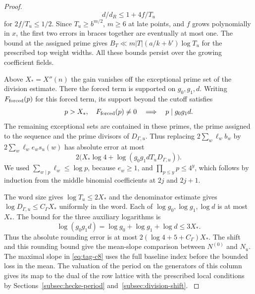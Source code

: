 \begin{proof}
\[
  d/d_R\le 1+4f/T_u
\]
 for \(2f/T_u\le1/2\). Since \(T_u\ge b^{m/2}\),
\(m\ge6\) at late points, and \(f\) grows polynomially in \(x\), the
first two errors in braces together are eventually at most one.
The bound at the assigned prime gives
\(B_T\ll m |T|(a/k+b')\log T_u\) for the prescribed top weight
widths. All these bounds persist over the growing coefficient fields.


Above \(X_*=X''(n)\) the gain vanishes off the exceptional
prime set of the division estimate. There the forced term
is supported on \(g_0,g_1,d\).
Writing \(F_{\rm forced}(p)\) for this forced term, its support beyond the cutoff satisfies
\[
  p>X_*,\quad F_{\rm forced}(p)\ne0\quad\Longrightarrow\quad p\mid g_0g_1d.
\]
 The remaining exceptional
sets are contained in these primes, the prime assigned to the sequence and the
prime divisors of \(D_{\Gamma,u}\). Thus replacing
\(2\sum_w\ell_w b_w\) by \(2\sum_w\ell_we_ws_u(w)\) has absolute
error at most
\[
 2\big(X_*\log4+\log(g_0g_1dT_uD_{\Gamma,u})\big).
\]
We used \(\sum_{w\mid p}\ell_w\le\log p\), because \(e_w\ge1\),
and \(\prod_{p\le y}p\le4^y\), which follows by induction from the
middle binomial coefficients at \(2j\) and \(2j+1\).

The word size gives \(\log T_u\le2X_*\) and the denominator
estimate gives \(\log D_{\Gamma,u}\le C_\Gamma X_*\)
uniformly in the word. Each of \(\log g_0,\log g_1,\log d\)
is at most \(X_*\).
The bound for the three auxiliary logarithms is
\[
  \log(g_0g_1d)=\log g_0+\log g_1+\log d\le 3X_* .
\]
 Thus the absolute rounding error is at
most \(2(\log4+5+C_\Gamma)X_*\). The shift and this rounding
bound give the mean-slope comparison between \(N^{(0)}\)
and \(N_u\). The maximal slope in \eqref{eq:tag-c8} uses the full
baseline index before the bounded loss in the mean.
The valuation of the period on the generators of this
column gives its map to the dual of the row lattice with the prescribed local conditions by
Sections~\ref{subsec:hecke-period} and~\ref{subsec:division-shift}.
\label{cor:column-orbit-length-2}
\end{proof}
